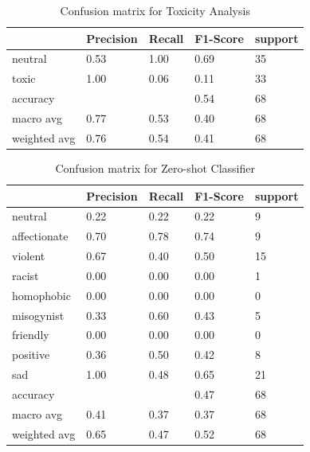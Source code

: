 \begin{table}[!htb]
    \centering
    \begin{tabular}{l|llll}
     & Precision & Recall & F1-Score & support \\ \hline \hline
    neutral & 0.53 & 1.00 & 0.69 & 35\\
    toxic & 1.00 & 0.06 & 0.11 & 33 \\ \hline
    accuracy & & & 0.54 & 68\\
    macro avg & 0.77 & 0.53 & 0.40 & 68 \\
    weighted avg & 0.76 & 0.54 & 0.41 & 68\\
    \end{tabular}
    \caption{Confusion matrix for Toxicity Analysis}
    \label{tab:confusion_matrix_toxicity}
\end{table}

\begin{table}[!htb]
\centering
\begin{tabular}{l|llll}
 & Precision & Recall & F1-Score & support \\ \hline \hline
neutral & 0.22 & 0.22 & 0.22 & 9\\
affectionate & 0.70 & 0.78 & 0.74 & 9 \\ 
violent & 0.67 & 0.40 & 0.50 & 15\\
racist & 0.00 & 0.00 & 0.00 & 1\\
homophobic & 0.00 & 0.00 & 0.00 & 0\\
misogynist & 0.33 & 0.60 & 0.43 & 5\\
friendly & 0.00 & 0.00 & 0.00 & 0\\
positive & 0.36 & 0.50 & 0.42 & 8\\
sad & 1.00 & 0.48 & 0.65 & 21\\ \hline
accuracy & & & 0.47 & 68\\
macro avg & 0.41 & 0.37 & 0.37 & 68 \\
weighted avg & 0.65 & 0.47 & 0.52 & 68\\
\end{tabular}
\caption{Confusion matrix for Zero-shot Classifier}
\label{tab:confusion_matrix_zero_shot}
\end{table}

\newpage







